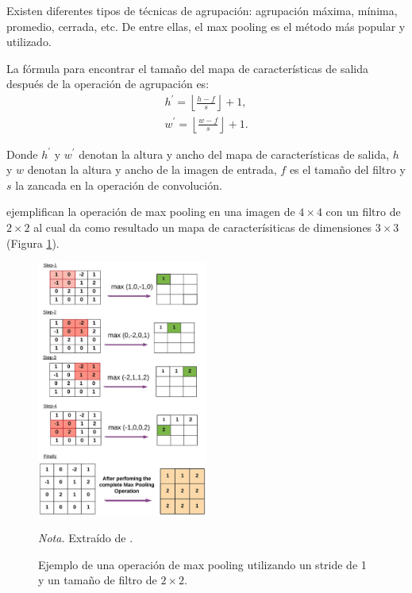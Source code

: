 Existen diferentes tipos de técnicas de agrupación: agrupación máxima, mínima, promedio, cerrada, etc. De entre ellas, el max pooling es el método 
más popular y utilizado.

La fórmula para encontrar el tamaño del mapa de características de salida después de la operación de agrupación es:
\begin{subequations}
    \begin{gather}
        h^{'} = \left\lfloor \frac{h - f}{s} \right\rfloor + 1,\\
        w^{'} = \left\lfloor \frac{w - f}{s} \right\rfloor + 1.
        \label{eq:pooling_size}
    \end{gather}
\end{subequations}

Donde $h^{'}$ y $w^{'}$ denotan la altura y ancho del mapa de características de salida, $h$  y $w$ denotan la altura y ancho de la imagen de entrada, 
$f$ es el tamaño del filtro y $s$ la zancada en la operación de convolución.

\citet{balas_recent_2020} ejemplifican la operación de max pooling en una imagen de $4\times4$ con un filtro de $2\times2$ al cual 
da como resultado un mapa de caracterísiticas de dimensiones $3\times3$ (Figura \ref{fig:max_pooling}). 
\begin{figure}[H]
    \centering
    \caption{Ejemplo de una operación de max pooling utilizando un stride de 1 y un tamaño de filtro de $2\times2$.}
    \includegraphics[width=0.5\textwidth]{img/4_marco_teorico/max_pooling.png}
    \label{fig:max_pooling}
    \begin{flushleft}
        \textit{Nota.} Extraído de \citet{balas_recent_2020}. 
        \vspace{-\baselineskip}       
    \end{flushleft}  
\end{figure}

